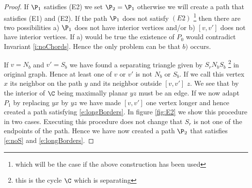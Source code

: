 \begin{proof}
If $\P_1$ satisfies (E2) we set $\P_2 = \P_1$ otherwise we will create a path that satisfies (E1) and (E2).
If the path $\P_1$ does not satisfy $(E2)$ \footnote{which will be the case if the above construction has been used} then there are two possibilities  a) $\P_1$ does not have interior vertices and/or b) $[v,v']$ does not have interior vertices. If a) would be true the existence of $P_0$ would contradict Invariant \ref{i:noChords}. Hence the only problem can be that $b)$ occurs.

If $v=N_b$ and $v'=S_b$ we have found a separating triangle given by $S_rN_bS_b$ \footnote{this is the cycle $\C$ which is separating} in original graph. Hence at least one of $v$ or $v'$ is not $N_b$ or $S_b$. If we call this vertex $x$ its neighbor on the path $y$ and its neighbor outside $[v,v']$ $z$. We see that by the interior of $\C$ being maximally planar $yz$ must be an edge. If we now adapt $P_1$ by replacing $yx$ by $yz$ we have made $[v,v']$ one vertex longer and hence created a path satisfying \ref{e:longBorders}. In figure \ref{fig:E2} we show this procedure in two cases. Executing this procedure does not change that $S_r$ is not one of the endpoints of the path. Hence we have now created a path $\P_2$ that satisfies \ref{e:noS} and \ref{e:longBorders}.


\end{proof}
